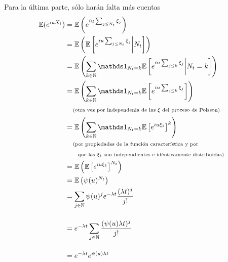 Para la última parte, sólo harán falta más cuentas
\begin{align}
        \E(e^{iuX_t})   &=  \E\left( e^{iu \sum_{j \leq N_t} \xi_j }  \right)                                                                       \\
                        &=  \E\left( \E\left[e^{iu \sum_{j \leq N_t} \xi_j } \bigg| N_t \right]\right)                                              \\
                        &=  \E\left( \sum_{k \in \N} \indic_{N_t = k} \E\left[e^{iu \sum_{j \leq k} \xi_j } \bigg| N_t = k \right]\right)           \\
                        &=  \E\left( \sum_{k \in \N} \indic_{N_t = k} \E\left[e^{iu \sum_{j \leq k} \xi_j } \right]\right)                          \\
                        &\comment{otra vez por independenia de las $\xi$ del proceso de Poisson}                                                    \\
                        &=  \E\left( \sum_{k \in \N} \indic_{N_t = k} \E\left[e^{iu \xi_1 } \right]^k \right)                                       \\
                        &\lcomment{por propiedades de la función característica y por}                                                              \\
                        &\rcomment{ que las $\xi_i$ son independientes e idénticamente distribuidas}                                                \\
                        &=  \E\left( \E\left[e^{iu \xi_1 } \right]^{N_t} \right)                                                                    \\
                        &=  \E\left( \psi(u)^{N_t} \right)                                                                                          \\
                        &=  \sum_{j \in \N} \psi(u)^{j} e^{- \lambda t} \frac{(\lambda t)^j}{j!}                                                    \\                                       \\
                        &=  e^{- \lambda t} \sum_{j \in \N}  \frac{(\psi(u) \lambda t)^j}{j!}                                                       \\                                       \\
                        &=  e^{- \lambda t} e^{\psi(u) \lambda t}                                                                                   \\                                       \\

\end{align}

